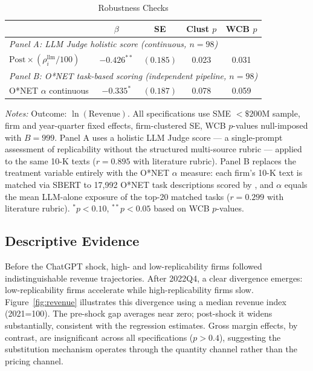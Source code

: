 \documentclass[12pt,a4paper]{article}
\begin{document}
\begin{table}[H]
\centering
\caption{Robustness Checks}
\label{tab:robust}
\begin{tabular}{lcccc}
\toprule
& $\beta$ & SE & Clust $p$ & WCB $p$ \\
\midrule
\multicolumn{5}{l}{\textit{Panel A: LLM Judge holistic score (continuous, $n=98$)}} \\
\midrule
$\text{Post} \times (\rho_i^{\text{llm}} / 100)$ & $-0.426^{**}$ & $(0.185)$ & 0.023 & 0.031 \\
\midrule
\multicolumn{5}{l}{\textit{Panel B: O*NET task-based scoring (independent pipeline, $n=98$)}} \\
\midrule
O*NET $\alpha$ continuous & $-0.335^{*}$ & $(0.187)$ & 0.078 & 0.059 \\
\bottomrule
\end{tabular}

\medskip
\small
\textit{Notes:} Outcome: $\ln(\text{Revenue})$. All specifications use SME $<\$200$M sample, firm and year-quarter fixed effects, firm-clustered SE, WCB $p$-values null-imposed with $B=999$. Panel A uses a holistic LLM Judge score --- a single-prompt assessment of replicability without the structured multi-source rubric --- applied to the same 10-K texts ($r = 0.895$ with literature rubric). Panel B replaces the treatment variable entirely with the O*NET $\alpha$ measure: each firm's 10-K text is matched via SBERT to 17,992 O*NET task descriptions scored by \citet{eloundou2024}, and $\alpha$ equals the mean LLM-alone exposure of the top-20 matched tasks ($r = 0.299$ with literature rubric). $^{*}p<0.10$, $^{**}p<0.05$ based on WCB $p$-values.
\end{table}

\subsection{Descriptive Evidence}

Before the ChatGPT shock, high- and low-replicability firms followed indistinguishable revenue trajectories. After 2022Q4, a clear divergence emerges: low-replicability firms accelerate while high-replicability firms slow. Figure~\ref{fig:revenue} illustrates this divergence using a median revenue index (2021=100). The pre-shock gap averages near zero; post-shock it widens substantially, consistent with the regression estimates. Gross margin effects, by contrast, are insignificant across all specifications ($p > 0.4$), suggesting the substitution mechanism operates through the quantity channel rather than the pricing channel.
\end{document}
